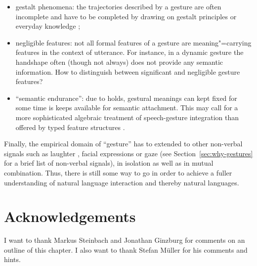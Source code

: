 \documentclass[output=paper]{langsci/langscibook}
\begin{document}
\begin{itemize}
\item gestalt phenomena: the trajectories described by a gesture are often incomplete and have to be completed by drawing on gestalt principles or everyday knowledge \citep{Luecking:2016};
\item negligible features: not all formal features of a gesture are meaning"=carrying features in the context of utterance. For instance, in a dynamic gesture the handshape often (though not always) does not provide any semantic information. How to distinguish between significant and negligible gesture features?
\item \enquote{semantic endurance}: due to holds, gestural meanings can kept fixed for some time is keeps available for semantic attachment. This may call for a more sophisticated algebraic treatment of speech-gesture integration than offered by typed feature structures \citep{Rieser:2015}.
\end{itemize}

Finally, the empirical domain of \enquote{gesture} has to extended to other non-verbal signals such as laughter \citep{Ginzburg:Breitholz:Cooper:Hough:Tian:2015}, facial expressions or gaze (see Section~\ref{sec:why-gestures} for a brief list of non-verbal signals), in isolation as well as in mutual combination.
%
Thus, there is still some way to go in order to achieve a fuller understanding of natural language interaction and thereby natural languages.


 
\section*{Acknowledgements}

I want to thank Markus Steinbach and Jonathan Ginzburg for comments on an outline of this chapter. 
%
I also want to thank Stefan Müller for his comments and hints.



{\sloppy
\printbibliography[heading=subbibliography,notkeyword=this]
}
\end{document}
